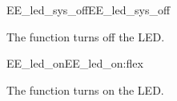 \begin{function_nopb2}{EE\_led\_sys\_off}{EE_led_sys_off}
  
  \begin{fundescription}
    The function turns off the LED.
  \end{fundescription}
  
  
  
\end{function_nopb2}

\begin{function_nopb2}{EE\_led\_on}{EE_led_on:flex}
  
  \begin{fundescription}
    The function turns on the LED.
  \end{fundescription}
  
  
  
\end{function_nopb2}

